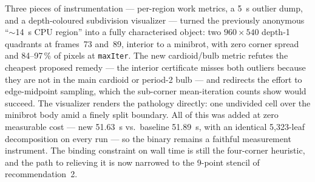 \documentclass[
	english,
	letterpaper, oneside
]{article}
\begin{document}
Three pieces of instrumentation --- per-region work metrics, a 5~s outlier dump,
and a depth-coloured subdivision visualizer --- turned the previously
anonymous ``$\sim$14~s CPU region'' into a fully characterised object: two
$960\times540$ depth-1 quadrants at frames~73 and~89, interior to a minibrot,
with zero corner spread and 84--97\,\% of pixels at \texttt{maxIter}. The new
cardioid/bulb metric refutes the cheapest proposed remedy --- the interior
certificate misses both outliers because they are not in the main cardioid or
period-2 bulb --- and redirects the effort to edge-midpoint sampling, which the
sub-corner mean-iteration counts show would succeed. The visualizer renders the
pathology directly: one undivided cell over the minibrot body amid a finely
split boundary. All of this was added at zero measurable cost --- new
51.63~s vs.\ baseline 51.89~s, with an identical 5{,}323-leaf decomposition on
every run --- so the binary remains a faithful measurement instrument. The
binding constraint on wall time is still the four-corner heuristic, and the path
to relieving it is now narrowed to the 9-point stencil of recommendation~2.
\end{document}
